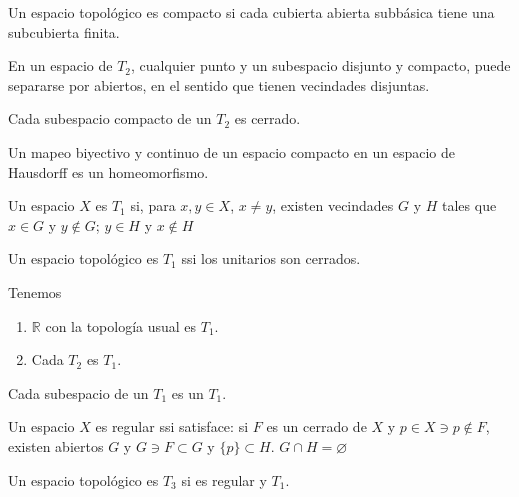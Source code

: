\begin{teorema}
    Un espacio topológico es compacto si cada cubierta abierta subbásica tiene una subcubierta finita. 
\end{teorema}

\begin{teorema}
    En un espacio de $T_2$, cualquier punto y un subespacio disjunto y compacto, puede separarse por abiertos, en el sentido que tienen vecindades disjuntas. 
\end{teorema}

\begin{teorema}
    Cada subespacio compacto de un $T_2$ es cerrado. 
\end{teorema}

\begin{teorema}
    Un mapeo biyectivo y continuo de un espacio compacto en un espacio de Hausdorff es un homeomorfismo. 
\end{teorema}


\begin{definicion}
    Un espacio $X$ es $T_1$ si, para $x,y\in X$, $x\neq y$, existen vecindades $G$ y $H$ tales que $x\in G$ y $y\not\in G$; $y\in H$ y $x\not\in H$ 
\end{definicion}

\begin{teorema}
    Un espacio topológico es $T_1$ ssi los unitarios son cerrados. 
\end{teorema}

\begin{prop}
    Tenemos 
    \begin{enumerate}
        \item $\mathbb{R}$ con la topología usual es $T_1$. 
        \item Cada $T_2$ es $T_1$. 
    \end{enumerate}
\end{prop}


\begin{teorema}
    Cada subespacio de un $T_1$ es un $T_1$. 
    
\end{teorema}


\begin{definicion}
    Un espacio $X$ es regular ssi satisface: 
    si $F$ es un cerrado de $X$ y $p\in X\ni p\not\in F$, existen abiertos $G$ y $G\ni F\subset G$ y $\{p\}\subset H$. $G\cap H=\varnothing$
\end{definicion}


\begin{definicion}
    Un espacio topológico es $T_3$ si es regular y $T_1$. 
\end{definicion}

